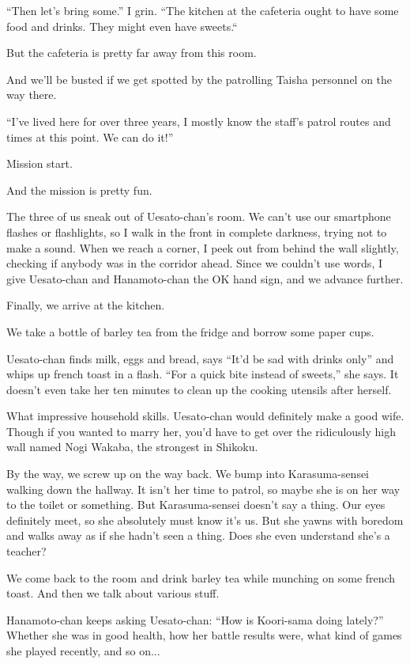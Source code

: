 ``Then let's bring some.'' I grin. ``The kitchen at the cafeteria ought to have some food and drinks. They might even have sweets.``

But the cafeteria is pretty far away from this room.

And we'll be busted if we get spotted by the patrolling Taisha personnel on the way there.

``I've lived here for over three years, I mostly know the staff's patrol routes and times at this point. We can do it!''

Mission start.

And the mission is pretty fun.

The three of us sneak out of Uesato-chan's room. We can't use our smartphone flashes or flashlights, so I walk in the front in complete darkness, trying not to make a sound. When we reach a corner, I peek out from behind the wall slightly, checking if anybody was in the corridor ahead. Since we couldn't use words, I give Uesato-chan and Hanamoto-chan the OK hand sign, and we advance further.

Finally, we arrive at the kitchen.

We take a bottle of barley tea from the fridge and borrow some paper cups.

Uesato-chan finds milk, eggs and bread, says ``It'd be sad with drinks only'' and whips up french toast in a flash. ``For a quick bite instead of sweets,'' she says. It doesn't even take her ten minutes to clean up the cooking utensils after herself.

What impressive household skills. Uesato-chan would definitely make a good wife. Though if you wanted to marry her, you'd have to get over the ridiculously high wall named Nogi Wakaba, the strongest in Shikoku.

By the way, we screw up on the way back. We bump into Karasuma-sensei walking down the hallway. It isn't her time to patrol, so maybe she is on her way to the toilet or something. But Karasuma-sensei doesn't say a thing. Our eyes definitely meet, so she absolutely must know it's us. But she yawns with boredom and walks away as if she hadn't seen a thing. Does she even understand she's a teacher?

We come back to the room and drink barley tea while munching on some french toast. And then we talk about various stuff.

Hanamoto-chan keeps asking Uesato-chan: ``How is Koori-sama doing lately?'' Whether she was in good health, how her battle results were, what kind of games she played recently, and so on...

